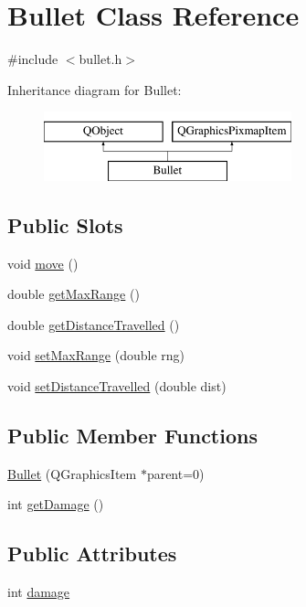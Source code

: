 \hypertarget{class_bullet}{}\section{Bullet Class Reference}
\label{class_bullet}


{\ttfamily \#include $<$bullet.\+h$>$}

Inheritance diagram for Bullet\+:\begin{figure}[H]
\begin{center}
\leavevmode
\includegraphics[height=2.000000cm]{class_bullet}
\end{center}
\end{figure}
\subsection*{Public Slots}
\begin{DoxyCompactItemize}
\item 
void \hyperlink{class_bullet_a6140db968c42c05e829e142f74f20b16}{move} ()
\item 
double \hyperlink{class_bullet_ada7a5f48649b2dc81ab1952cff51b6d9}{get\+Max\+Range} ()
\item 
double \hyperlink{class_bullet_ade9a9d09e42c002c7d30b65299194588}{get\+Distance\+Travelled} ()
\item 
void \hyperlink{class_bullet_a070852a34b912c9379338df18e32cf91}{set\+Max\+Range} (double rng)
\item 
void \hyperlink{class_bullet_ac1037d7a9f775b28bf1bc2727c018707}{set\+Distance\+Travelled} (double dist)
\end{DoxyCompactItemize}
\subsection*{Public Member Functions}
\begin{DoxyCompactItemize}
\item 
\hyperlink{class_bullet_a3d9f64399991ef430df460cac893b731}{Bullet} (Q\+Graphics\+Item $\ast$parent=0)
\item 
int \hyperlink{class_bullet_a682701fa7f9d4a9564dbcd6ed3f73588}{get\+Damage} ()
\end{DoxyCompactItemize}
\subsection*{Public Attributes}
\begin{DoxyCompactItemize}
\item 
int \hyperlink{class_bullet_a733d2ebbf9143c9ca68d3eb7e14121d0}{damage}
\end{DoxyCompactItemize}
